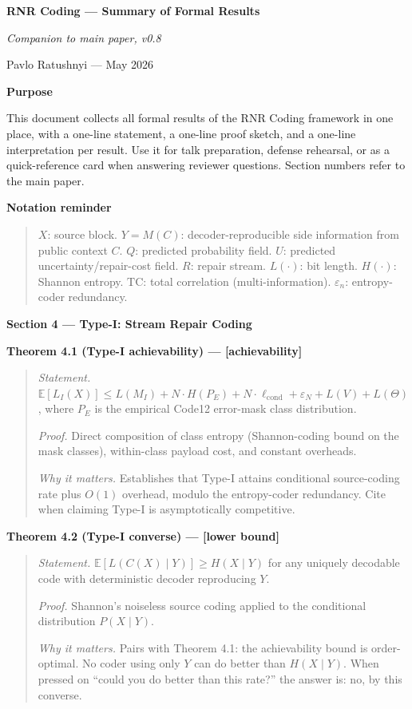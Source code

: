 \documentclass[
]{article}
\author{}
\date{}
\begin{document}
\textbf{RNR Coding --- Summary of Formal Results}

\emph{Companion to main paper, v0.8}

Pavlo Ratushnyi --- May 2026

\textbf{Purpose}

This document collects all formal results of the RNR Coding framework in
one place, with a one-line statement, a one-line proof sketch, and a
one-line interpretation per result. Use it for talk preparation, defense
rehearsal, or as a quick-reference card when answering reviewer
questions. Section numbers refer to the main paper.

\textbf{Notation reminder}

\begin{quote}
$X$: source block. $Y = M(C)$: decoder-reproducible side information
from public context $C$. $Q$: predicted probability field. $U$:
predicted uncertainty/repair-cost field. $R$: repair stream.
$L(\cdot)$: bit length. $H(\cdot)$: Shannon entropy. $\mathrm{TC}$:
total correlation (multi-information). $\varepsilon_n$:
entropy-coder redundancy.
\end{quote}

\textbf{Section 4 --- Type-I: Stream Repair Coding}

\textbf{Theorem 4.1 (Type-I achievability) --- {[}achievability{]}}

\begin{quote}
\emph{Statement.} $\mathbb{E}[L_I(X)] \leq L(M_I) + N \cdot H(P_E) +
N \cdot \ell_{\text{cond}} + \varepsilon_N + L(V) + L(\Theta)$, where
$P_E$ is the empirical Code12 error-mask class distribution.

\emph{Proof.} Direct composition of class entropy (Shannon-coding
bound on the mask classes), within-class payload cost, and constant
overheads.

\emph{Why it matters.} Establishes that Type-I attains conditional
source-coding rate plus $O(1)$ overhead, modulo the entropy-coder
redundancy. Cite when claiming Type-I is asymptotically competitive.
\end{quote}

\textbf{Theorem 4.2 (Type-I converse) --- {[}lower bound{]}}

\begin{quote}
\emph{Statement.} $\mathbb{E}[L(C(X) \mid Y)] \geq H(X \mid Y)$ for
any uniquely decodable code with deterministic decoder reproducing
$Y$.

\emph{Proof.} Shannon's noiseless source coding applied to the
conditional distribution $P(X \mid Y)$.

\emph{Why it matters.} Pairs with Theorem 4.1: the achievability
bound is order-optimal. No coder using only $Y$ can do better than
$H(X \mid Y)$. When pressed on ``could you do better than this
rate?'' the answer is: no, by this converse.
\end{quote}
\end{document}

